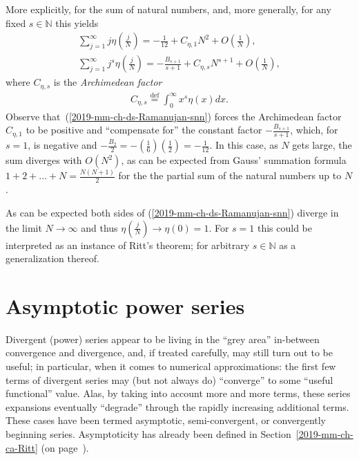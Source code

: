 More explicitly, for the sum of natural numbers, and, more generally, for any fixed $s\in \mathbb{N}$ this yields\cite{Tao-2013}
\begin{equation}
\begin{split}
\sum_{j=1}^\infty j \eta \left(\frac{j}{N}\right)
= - \frac{1}{12} + C_{\eta ,1} N^2 + O\left(\frac{1}{N}\right)
,  \\
\sum_{j=1}^\infty j^s \eta \left(\frac{j}{N}\right)
= - \frac{B_{s+1}}{s+1} + C_{\eta ,s} N^{s+1} + O\left(\frac{1}{N}\right)
,
\end{split}
\label{2019-mm-ch-ds-Ramanujan-snn}
\end{equation}
where   $C_{\eta ,s}$ is the
{\em Archimedean factor}
\begin{equation}
\begin{split}
C_{\eta ,s}
\stackrel{\text{def}}{=}
\int_0^\infty x^s \eta (x) dx
.
\end{split}
\label{2019-mm-ch-ds-Ramanujan-af}
\end{equation}
Observe that~(\ref{2019-mm-ch-ds-Ramanujan-snn})
forces the Archimedean factor $C_{\eta ,1}$ to be positive and ``compensate for'' the constant factor
$-\frac{B_{s+1}}{s+1}$, which, for $s=1$, is negative and $-\frac{B_{2}}{2}=-\left(\frac{1}{6}\right)\left(\frac{1}{2}\right)=-\frac{1}{12}$.
In this case, as $N$ gets large, the sum diverges with $O\left(N^2\right)$, as can be expected from Gauss' summation formula $1+2+...+N= \frac{N(N+1)}{2}$
for the  the partial sum of the natural numbers up to $N$.

As can be expected both sides of (\ref{2019-mm-ch-ds-Ramanujan-snn}) diverge in the limit $N \rightarrow \infty$ and thus
$\eta \left(\frac{j}{N}\right)\rightarrow \eta (0)=1$.
For $s=1$ this could be interpreted as an instance of Ritt's theorem;
for arbitrary $s\in \mathbb{N}$ as a generalization thereof.


\section{Asymptotic power series}
\label{2019-mm-ch-ds-aps}


Divergent (power) series appear to be
living in the ``grey area'' in-between convergence and divergence, and, if
treated carefully,
may still turn out to be useful; in particular, when it comes to numerical approximations:
the first few terms of divergent series may (but not always do) ``converge''
to some ``useful functional'' value.
Alas, by taking into account more and more terms,
these series expansions eventually ``degrade'' through the rapidly increasing additional terms.
These cases have been termed asymptotic,\cite[-90mm]{Erdelyi-1956,Bender-Orszag,Balser-1994} semi-convergent, or convergently beginning series.
Asymptoticity has already been defined
in Section~\ref{2019-mm-ch-ca-Ritt} (on page~\pageref{2019-mm-ch-ca-Ritt}).

